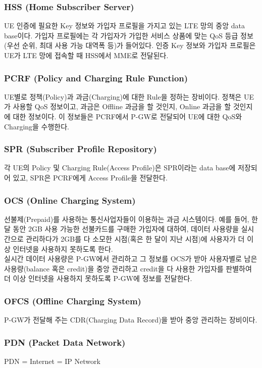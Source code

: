     \subsubsection*{HSS (Home Subscriber Server)}
    UE 인증에 필요한 Key 정보와 가입자 프로필을 가지고 있는 LTE 망의 중앙 data base이다. 가입자 프로필에는 각 가입자가 가입한 서비스 상품에 맞는 QoS 등급 정보(우선 순위, 최대 사용 가능 대역폭 등)가 들어있다. 인증 Key 정보와 가입자 프로필은 UE가 LTE 망에 접속할 때 HSS에서 MME로 전달된다.
\vspace{-2mm}
    \subsubsection*{PCRF (Policy and Charging Rule Function)}
    UE별로 정책(Policy)과 과금(Charging)에 대한 Rule을 정하는 장비이다. 정책은 UE가 사용할 QoS 정보이고, 과금은 Offline 과금을 할 것인지, Online 과금을 할 것인지에 대한 정보이다. 이 정보들은 PCRF에서 P-GW로 전달되어 UE에 대한 QoS와 Charging을 수행한다.
\vspace{-2mm}
    \subsubsection*{SPR (Subscriber Profile Repository)}
    각 UE의 Policy 및 Charging Rule(Access Profile)은 SPR이라는 data base에 저장되어 있고, SPR은 PCRF에게 Access Profile을 전달한다.
\vspace{-2mm}
    \subsubsection*{OCS (Online Charging System)}
    선불제(Prepaid)를 사용하는 통신사업자들이 이용하는 과금 시스템이다. 예를 들어, 한달 동안 2GB 사용 가능한 선불카드를 구매한 가입자에 대하여, 데이터 사용량을 실시간으로 관리하다가 2GB를 다 소모한 시점(혹은 한 달이 지난 시점)에 사용자가 더 이상 인터넷을 사용하지 못하도록 한다. \\
    실시간 데이터 사용량은 P-GW에서 관리하고 그 정보를 OCS가 받아 사용자별로 남은 사용량(balance 혹은 credit)을 중앙 관리하고 credit을 다 사용한 가입자를 판별하여 더 이상 인터넷을 사용하지 못하도록 P-GW에 정보를 전달한다.
\vspace{-2mm}
    \subsubsection*{OFCS (Offline Charging System)}
    P-GW가 전달해 주는 CDR(Charging Data Record)을 받아 중앙 관리하는 장비이다.
\vspace{-2mm}
    \subsubsection*{PDN (Packet Data Network)}
    PDN = Internet = IP Network
\newpage
